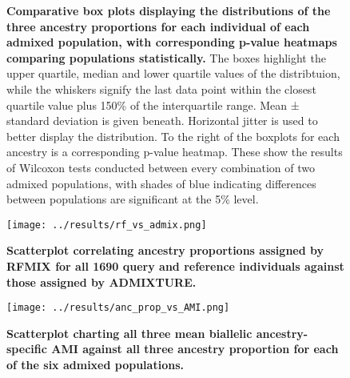 \documentclass[11pt]{article}
\begin{document}
\begin{figure}[ht!]%
    \centering
     \hspace*{0em}
        \vspace{-0.6cm}
        \caption{\textbf{
            Comparative box plots displaying the distributions of the three ancestry proportions for each individual of each admixed population, with corresponding p-value heatmaps comparing populations statistically.
        }
            The boxes highlight the upper quartile, median and lower quartile values of the distribtuion, while the whiskers signify the last data point within the closest quartile value plus 150\% of the interquartile range. Mean ± standard deviation is given beneath. Horizontal jitter is used to better display the distribution. To the right of the boxplots for each ancestry is a corresponding p-value heatmap. These show the results of Wilcoxon tests conducted between every combination of two admixed populations, with shades of blue indicating differences between populations are significant at the 5\% level.
        }
\end{figure}




\begin{figure}[htb!]%
    \centering
    \texttt{[image: ../results/rf\_vs\_admix.png]} 
    \vspace{.2cm}
    \caption{\textbf{
        Scatterplot correlating ancestry proportions assigned by RFMIX for all 1690 query and reference individuals against those assigned by ADMIXTURE.
    }
    }
\end{figure}




\begin{figure}[htb!]%
    \centering
    \texttt{[image: ../results/anc\_prop\_vs\_AMI.png]} 
    \vspace{.2cm}
    \caption{\textbf{
        Scatterplot charting all three mean biallelic ancestry-specific AMI against all three ancestry proportion for each of the six admixed populations.
    }
    }
\end{figure}
\end{document}
